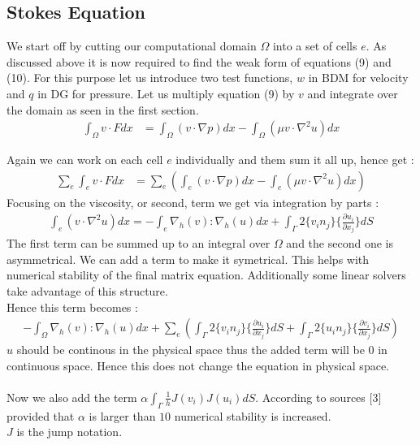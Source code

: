 \documentclass[11pt,twoside,a4paper]{article}
\begin{document}
\subsection{Stokes Equation}
We start off by cutting our computational domain $\Omega$ into a set of cells $e$. As discussed above it is now required to find the weak form of equations (9) and (10).
For this purpose let us introduce two test functions, $w$ in BDM for velocity and $q$ in DG for pressure.
Let us multiply equation (9) by $v$ and integrate over the domain as seen in the first section.
\begin{align*}
\int_\Omega v \cdot F dx &= \int_\Omega (v \cdot \nabla p) dx - \int_\Omega (\mu v \cdot \nabla^2 u) dx
\end{align*}

Again we can work on each cell $e$ individually and them sum it all up, hence get :
\begin{align*}
\sum_e \int_e v \cdot F dx &= \sum_e (\int_e (v \cdot \nabla p) dx - \int_e (\mu v \cdot \nabla^2 u) dx)
\end{align*}
Focusing on the viscosity, or second, term we get via integration by parts :
\begin{align*}
\int_e (v \cdot \nabla^2 u) dx = - \int_e \nabla_h(v) : \nabla_h(u) dx + \int_\Gamma 2 \{ v_i n_j \} \{ \frac{\partial u_i}{\partial x_j}\} dS
\end{align*}
The first term can be summed up to an integral over $\Omega$ and the second one is asymmetrical. We can add a term to make it symetrical. This helps with numerical stability of the final matrix equation. Additionally some linear solvers take advantage of this structure.\\
Hence this term becomes :
\begin{align*}
-  \int_\Omega \nabla_h(v) : \nabla_h(u) dx + \sum_e( \int_\Gamma 2 \{ v_i n_j \} \{ \frac{\partial u_i}{\partial x_j}\} dS + \int_\Gamma 2 \{ u_i n_j \} \{ \frac{\partial v_i}{\partial x_j}\} dS)
\end{align*}
$u$ should be continous in the physical space thus the added term will be $0$ in continuous space. Hence this does not change the equation in physical space.\\
\\
Now we also add the term $\alpha \int_\Gamma \frac{1}{h}  J(v_i) J(u_i) dS$. According to sources [3] provided that  $\alpha$ is larger than $10$ numerical stability is increased.\\
$J$ is the jump notation.\\
\end{document}
